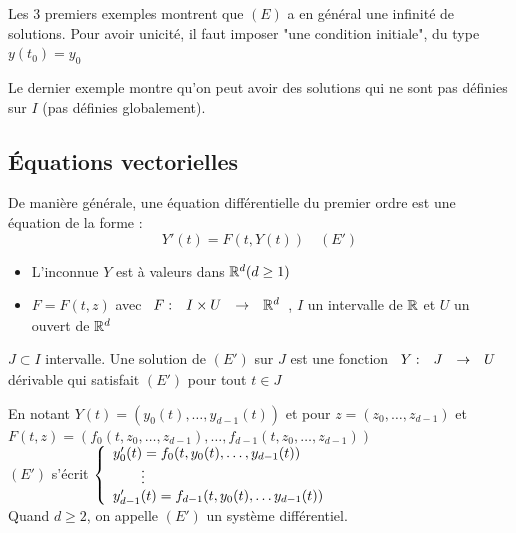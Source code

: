 \documentclass[]{report}
\begin{document}
\begin{re}{}{}
    Les 3 premiers exemples montrent que $(E)$ a en général une infinité de solutions. Pour avoir unicité, il faut imposer "une condition initiale", du type $y(t_0)=y_0$
\end{re}

\begin{re}{}{}
    Le dernier exemple montre qu'on peut avoir des solutions qui ne sont pas définies sur $I$ (pas définies globalement).
\end{re}

\subsection{Équations vectorielles}

De manière générale, une équation différentielle du premier ordre est une équation de la forme :$$Y'(t)=F(t,Y(t))\quad (E')$$
\begin{itemize}
    \item L'inconnue $Y$ est à valeurs dans $\mathbb{R}^d (d\ge1)$
    \item $F=F(t,z)$ avec $\begin{array}{ccccc} F : & I\times U & \to & \mathbb{R}^d \end{array}$, $I$ un intervalle de $\mathbb{R}$ et $U$ un ouvert de $\mathbb{R}^d$
\end{itemize}

\begin{df}{}{}
    $J\subset I$ intervalle. Une solution de $(E')$ sur $J$ est une fonction $\begin{array}{ccccc} Y : & J & \to & U \end{array}$ dérivable qui satisfait $(E')$ pour tout $t\in J$
\end{df}

\begin{re}{}{}
    En notant $Y(t)=(y_0(t),\dots,y_{d-1}(t))$ et pour $z=(z_0,\dots,z_{d-1})$ et $F(t,z)=(f_0(t,z_0,\dots,z_{d-1}),\dots,f_{d-1}(t,z_0,\dots,z_{d-1}))$\\
    $(E')$ s'écrit $\left\{\begin{array}{ll} y_0'(t)=f_0(t,y_0(t),\dots,y_{d-1}(t))\\\qquad\vdots\\y_{d-1}'(t)=f_{d-1}(t,y_0(t),\dots y_{d-1}(t)) \end{array} \right.$\\
    Quand $d\ge 2$, on appelle $(E')$ un système différentiel.
\end{re}
\end{document}

